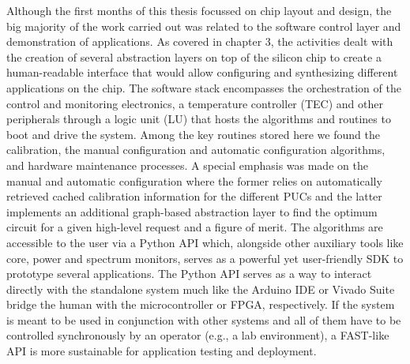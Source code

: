 Although the first months of this thesis focussed on chip layout and design, the big majority of the work carried out was related to the software control layer and demonstration of applications.
As covered in chapter 3, the activities dealt with the creation of several abstraction layers on top of the silicon chip to create a human-readable interface that would allow configuring and synthesizing different applications on the chip.
The software stack encompasses the orchestration of the control and monitoring electronics, a temperature controller (TEC) and other peripherals through a logic unit (LU) that hosts the algorithms and routines to boot and drive the system.
Among the key routines stored here we found the calibration, the manual configuration and automatic configuration algorithms, and hardware maintenance processes.
A special emphasis was made on the manual and automatic configuration where the former relies on automatically retrieved cached calibration information for the different PUCs and the latter implements an additional graph-based abstraction layer to find the optimum circuit for a given high-level request and a figure of merit.
The algorithms are accessible to the user via a Python API which, alongside other auxiliary tools like core, power and spectrum monitors, serves as a powerful yet user-friendly SDK to prototype several applications.
The Python API serves as a way to interact directly with the standalone system much like the Arduino IDE \cite{noauthor_software_nodate} or Vivado Suite \cite{noauthor_amd_nodate} bridge the human with the microcontroller or FPGA, respectively.
If the system is meant to be used in conjunction with other systems and all of them have to be controlled synchronously by an operator (e.g., a lab environment), a FAST-like API \cite{noauthor_fastapi_nodate} is more sustainable for application testing and deployment.

